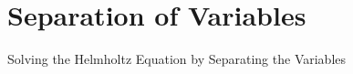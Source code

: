\chapter{Separation of Variables}

\begin{section}{Solving the Helmholtz Equation by Separating the Variables}

\end{section}
